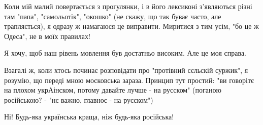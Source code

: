 Коли мій малий повертається з прогулянки, і в його лексиконі з'являються різні
там "папа", "самольотік", "окошко" (не скажу, що так буває часто, але
трапляється), я одразу ж намагаюся це виправити. Миритися з тим усім, "бо це ж
Одеса", не в моїх правилах! 

Я хочу, щоб наш рівень мовлення був достатньо високим. Але це моя справа. 

Взагалі ж, коли хтось починає розповідати про "протівний сєльскій суржик", я
розумію, що переді мною московська зараза. Принцип тут простий: "ви говорітє на
плохом укрАінском, потому давайте лучше - на русском" (поганою російською? -
"нє важно, главноє - на русском")

Ні! Будь-яка українська краща, ніж будь-яка російська!

